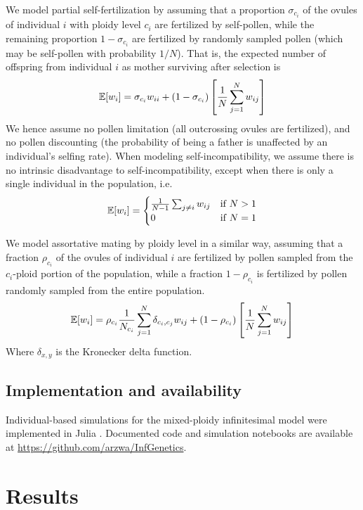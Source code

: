 \documentclass[12pt,a4paper]{article}
\begin{document}
We model partial self-fertilization by assuming that a proportion
$\sigma_{c_i}$ of the ovules of individual $i$ with ploidy level $c_i$ are
fertilized by self-pollen, while the remaining proportion $1-\sigma_{c_i}$ are
fertilized by randomly sampled pollen (which may be self-pollen with
probability $1/N$). 
That is, the expected number of offspring from individual $i$ as mother
surviving after selection is
\begin{equation}
\mathbb{E}[w_i] = \sigma_{c_i} w_{ii} +
  (1-\sigma_{c_i})\left[\frac{1}{N}\sum_{j=1}^N w_{ij}\right]
\end{equation}
We hence assume no pollen limitation (all outcrossing ovules are fertilized),
and no pollen discounting (the probability of being a father is unaffected by
an individual's selfing rate).
When modeling self-incompatibility, we assume there is no intrinsic
disadvantage to self-incompatibility, except when there is only a single
individual in the population, i.e.
\begin{equation}
\mathbb{E}[w_i] = \begin{cases}
    \frac{1}{N-1}\sum_{j \ne i }w_{ij} & \text{if } N > 1\\ 
    0 & \text{if } N=1 \end{cases}
\end{equation}

We model assortative mating by ploidy level in a similar way, assuming that a
fraction $\rho_{c_i}$ of the ovules of individual $i$ are fertilized by pollen
sampled from the $c_i$-ploid portion of the population, while a fraction
$1-\rho_{c_i}$ is fertilized by pollen randomly sampled from the entire
population.
\begin{equation}
\mathbb{E}[w_i] = \rho_{c_i} \frac{1}{N_{c_{i}}} \sum_{j=1}^N \delta_{c_i,c_j}w_{ij}
 + (1-\rho_{c_i})
\left[\frac{1}{N}\sum_{j=1}^N w_{ij}\right]
\end{equation}
Where $\delta_{x,y}$ is the Kronecker delta function.

\subsection*{Implementation and availability}

Individual-based simulations for the mixed-ploidy infinitesimal model were
implemented in Julia \citep{julia}.
Documented code and simulation notebooks are available at
\url{https://github.com/arzwa/InfGenetics}.

\section*{Results}
\end{document}
